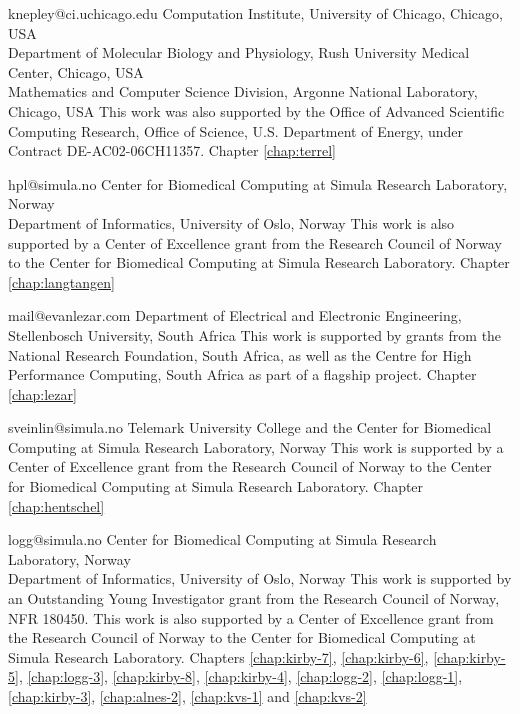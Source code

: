              {knepley@ci.uchicago.edu}
             {Computation Institute, University of Chicago, Chicago, USA \\
              Department of Molecular Biology and Physiology, Rush University Medical Center, Chicago, USA \\
              Mathematics and Computer Science Division, Argonne National Laboratory, Chicago, USA}
             {This work was also supported by the Office of Advanced Scientific Computing
              Research, Office of Science, U.S. Department of Energy, under Contract DE-AC02-06CH11357.}
             {Chapter \ref{chap:terrel}}

             {hpl@simula.no}
             {Center for Biomedical Computing at Simula Research Laboratory, Norway \\
              Department of Informatics, University of Oslo, Norway}
             {This work is also supported by a Center of Excellence
              grant from the Research Council of Norway to the Center
              for Biomedical Computing at Simula Research
              Laboratory.}
             {Chapter \ref{chap:langtangen}}

             {mail@evanlezar.com}
             {Department of Electrical and Electronic Engineering, Stellenbosch University, South Africa}
             {This work is supported by grants from the National Research
              Foundation, South Africa, as well as the Centre for High Performance
              Computing, South Africa as part of a flagship project.}
             {Chapter \ref{chap:lezar}}

             {sveinlin@simula.no}
             {Telemark University College and the Center for Biomedical Computing at Simula Research Laboratory, Norway}
             {This work is supported by a Center of Excellence
              grant from the Research Council of Norway to the Center
              for Biomedical Computing at Simula Research
              Laboratory.}
             {Chapter \ref{chap:hentschel}}

             {logg@simula.no}
             {Center for Biomedical Computing at Simula Research Laboratory, Norway \\
              Department of Informatics, University of Oslo, Norway}
             {This work is supported by an Outstanding Young
              Investigator grant from the Research Council of Norway,
              NFR 180450. This work is also supported by a Center of
              Excellence grant from the Research Council of Norway to
              the Center for Biomedical Computing at Simula Research
              Laboratory.}
             {Chapters
              \ref{chap:kirby-7},
              \ref{chap:kirby-6},
              \ref{chap:kirby-5},
              \ref{chap:logg-3},
              \ref{chap:kirby-8},
              \ref{chap:kirby-4},
              \ref{chap:logg-2},
              \ref{chap:logg-1},
              \ref{chap:kirby-3},
              \ref{chap:alnes-2},
              \ref{chap:kvs-1} and
              \ref{chap:kvs-2}}


